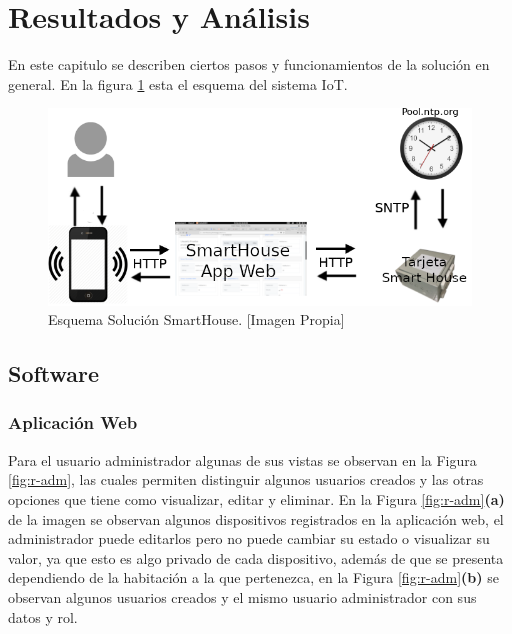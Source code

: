 \section{Resultados y Análisis}

En este capitulo se describen ciertos pasos y funcionamientos de la solución en general. En la figura \ref{fig:iot} esta el esquema del sistema IoT.\\

\begin{figure}[!t]
	\centering
	\caption[Esquema Solución SmartHouse.]{Esquema Solución SmartHouse. [Imagen Propia]}
	\label{fig:iot}
	\includegraphics[width=0.5\linewidth]{Imagenes/IOT}
\end{figure}

\subsection{Software}

\subsubsection{Aplicación Web}

Para el usuario administrador algunas de sus vistas se observan en la Figura \ref{fig:r-adm}, las cuales permiten distinguir algunos usuarios creados y las otras opciones que tiene como visualizar, editar y eliminar. En la Figura \ref{fig:r-adm}\textbf{(a)} de la imagen se observan algunos dispositivos registrados en la aplicación web, el administrador puede editarlos pero no puede cambiar su estado o visualizar su valor, ya que esto es algo privado de cada dispositivo, además de que se presenta dependiendo de la habitación a la que pertenezca, en la Figura \ref{fig:r-adm}\textbf{(b)} se observan algunos usuarios creados y el mismo usuario administrador con sus datos y rol.\\

